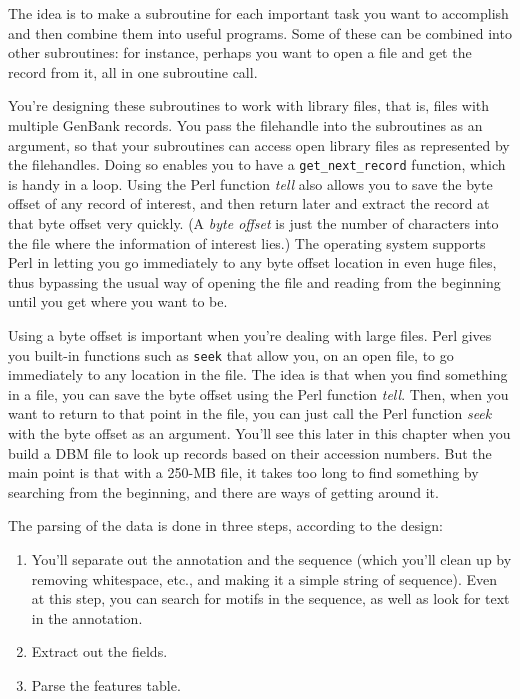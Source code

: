 The idea is to make a subroutine for each important task you want to accomplish and then combine them into useful programs. Some of these can be combined into other subroutines: for instance, perhaps you want to open a file and get the record from it, all in one subroutine call.

You're designing these subroutines to work with library files, that is, files with multiple GenBank records. You pass the filehandle into the subroutines as an argument, so that your subroutines can access open library files as represented by the filehandles. Doing so enables you to have a \verb|get_next_record| function, which is handy in a loop. Using the Perl function \textit{tell} also allows you to save the byte offset of any record of interest, and then return later and extract the record at that byte offset very quickly. (A \textit{byte offset} is just the number of characters into the file where the information of interest lies.) The operating system supports Perl in letting you go immediately to any byte offset location in even huge files, thus bypassing the usual way of opening the file and reading from the beginning until you get where you want to be.  

Using a byte offset is important when you're dealing with large files. Perl gives you built-in functions such as \verb|seek| that allow you, on an open file, to go immediately to any location in the file. The idea is that when you find something in a file, you can save the byte offset using the Perl function \textit{tell}. Then, when you want to return to that point in the file, you can just call the Perl function \textit{seek} with the byte offset as an argument. You'll see this later in this chapter when you build a DBM file to look up records based on their accession numbers. But the main point is that with a 250-MB file, it takes too long to find something by searching from the beginning, and there are ways of getting around it.

The parsing of the data is done in three steps, according to the design: 

\begin{enumerate}
  \item You'll separate out the annotation and the sequence (which you'll clean up by removing whitespace, etc., and making it a simple string of sequence). Even at this step, you can search for motifs in the sequence, as well as look for text in the annotation.
  \item Extract out the fields.
  \item Parse the features table.
\end{enumerate}

